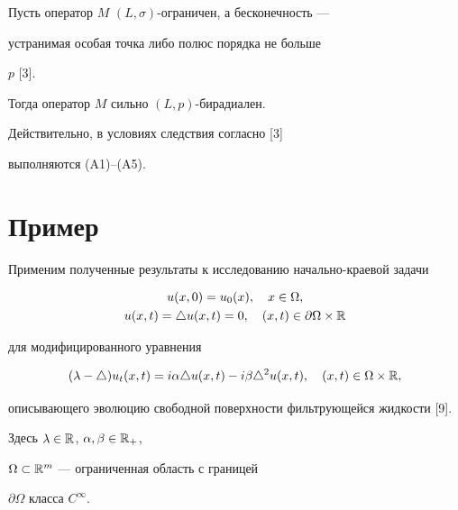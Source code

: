 \begin{cors}


Пусть оператор $M$\; $(L,\sigma )$-ограничен, а бесконечность ---


устранимая особая точка либо полюс порядка не больше


$p$ [3].


Тогда оператор $M$ сильно $(L,p)$-бирадиален.


\end{cors}





Действительно, в условиях следствия согласно [3]


выполняются (A1)--(A5).





\section{Пример}





Применим полученные результаты к исследованию начально-краевой задачи


\begin{gather}


u(x,0)=u_0(x),\quad x\in\Omega,\\


u(x,t)=\triangle u(x,t)=0,\quad (x,t)\in\partial\Omega\times {\Bbb R}


\end{gather}


для модифицированного уравнения


\begin{equation}


(\lambda -\triangle)u_t(x,t)=i\alpha\triangle u(x,t)-


i\beta\triangle ^2u(x,t),\quad


(x,t)\in\Omega\times {\Bbb R},


\end{equation}


описывающего эволюцию свободной поверхности фильтрующейся жидкости [9].


Здесь $\lambda\in {\Bbb R}$, $\alpha ,\beta\in {\Bbb R}_+$,


$\Omega\subset {\Bbb R}^m$ --- ограниченная область с границей


$\partial\Omega$ класса $C^{\infty }$.





